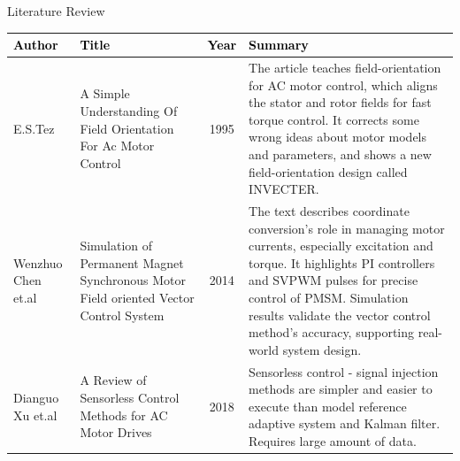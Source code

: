 \begin{frame}{Literature Review}
	\begin{center}
		
	\begin{table}
		\centering
		\tiny
		\begin{tabular}{|p{1.4cm}|p{}|c|p{6cm}|}
			\hline
			\rowcolor{yellow} %
	
			 \textcolor{black}{\textbf{Author}} & \textcolor{black}{\textbf{Title}} & \textcolor{black}{\textbf{Year}} & \textcolor{black}{\textbf{Summary}}  \\ 
			
			\hline
			\vspace{0.005in} E.S.Tez & \vspace{0.005in} A Simple Understanding Of Field Orientation For Ac Motor Control & \vspace{0.01in} 1995 &  \vspace{0.005in} \RaggedRight The article teaches field-orientation for AC motor control, which aligns the stator and rotor fields for fast torque control. It corrects some wrong ideas about motor models and parameters, and shows a new field-orientation design called INVECTER.  \\
		 \hline
		  \vspace{0.1in}
		   \vspace{0.005in}  Wenzhuo Chen et.al & \vspace{0.005in}  Simulation of Permanent Magnet Synchronous Motor Field oriented Vector Control System & 2014 & \vspace{0.04in} \RaggedRight The text describes coordinate conversion's role in managing motor currents, especially excitation and torque. It highlights PI controllers and SVPWM pulses for precise control of PMSM. Simulation results validate the vector control method's accuracy, supporting real-world system design.\vspace{0.04in} \\
			\hline
		   \vspace{0.005in}  Dianguo Xu  et.al &\vspace{0.005in}  A Review of Sensorless Control Methods for AC Motor Drives & 2018  & \vspace{0.04in} \RaggedRight Sensorless control - signal injection methods are simpler and easier to execute than model reference adaptive system and Kalman filter. Requires large amount of data. \vspace{0.04in} \\
			\hline 
		   

\end{tabular}
\end{table}
\end{center}
\end{frame}
